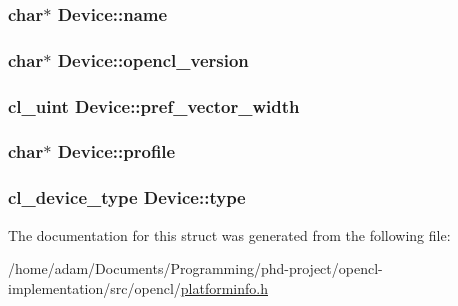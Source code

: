 \subsubsection[{name}]{\setlength{\rightskip}{0pt plus 5cm}char$\ast$ Device\+::name}\label{structDevice_a92d6cdb382fa19b62b961c3ae5288c0b}
\hypertarget{structDevice_a37d2eb2c36cde8a0d35a71ff1b7a9bda}{}
\subsubsection[{opencl\+\_\+version}]{\setlength{\rightskip}{0pt plus 5cm}char$\ast$ Device\+::opencl\+\_\+version}\label{structDevice_a37d2eb2c36cde8a0d35a71ff1b7a9bda}
\hypertarget{structDevice_a0fcbcc0f92b61319434da1132cee7045}{}
\subsubsection[{pref\+\_\+vector\+\_\+width}]{\setlength{\rightskip}{0pt plus 5cm}cl\+\_\+uint Device\+::pref\+\_\+vector\+\_\+width}\label{structDevice_a0fcbcc0f92b61319434da1132cee7045}
\hypertarget{structDevice_a8c2887a2df95caba5235491cc8663435}{}
\subsubsection[{profile}]{\setlength{\rightskip}{0pt plus 5cm}char$\ast$ Device\+::profile}\label{structDevice_a8c2887a2df95caba5235491cc8663435}
\hypertarget{structDevice_a4331ce8386201fca48db55cdbe39f94a}{}
\subsubsection[{type}]{\setlength{\rightskip}{0pt plus 5cm}cl\+\_\+device\+\_\+type Device\+::type}\label{structDevice_a4331ce8386201fca48db55cdbe39f94a}


The documentation for this struct was generated from the following file\+:\begin{DoxyCompactItemize}
\item 
/home/adam/\+Documents/\+Programming/phd-\/project/opencl-\/implementation/src/opencl/\hyperlink{platforminfo_8h}{platforminfo.\+h}\end{DoxyCompactItemize}
